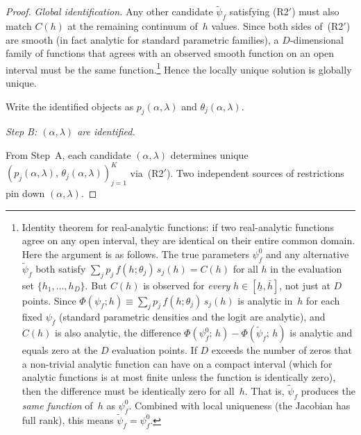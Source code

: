 \documentclass[12pt]{article}
\theoremstyle{plain}
\theoremstyle{plain}
\theoremstyle{definition}
\theoremstyle{remark}
\begin{document}
\begin{proof}
\emph{Global identification.}  Any other candidate $\tilde{\psi}_f$ satisfying (R2$'$) must also match $C(h)$ at the remaining continuum of~$h$ values.  Since both sides of~(R2$'$) are smooth (in fact analytic for standard parametric families), a $D$-dimensional family of functions that agrees with an observed smooth function on an open interval must be the same function.\footnote{Identity theorem for real-analytic functions: if two real-analytic functions agree on  any open interval, they are identical on their entire common domain.  Here the argument is as follows.  The true parameters $\psi_f^0$ and any alternative $\tilde{\psi}_f$ both satisfy $\sum_j p_j\,f(h;\theta_j)\,s_j(h) = C(h)$ for all $h$ in the evaluation set $\{h_1,\ldots,h_D\}$.  But $C(h)$ is observed for \emph{every} $h \in [\underline{h},\bar{h}]$, not just at $D$ points.  Since $\Phi(\psi_f; h) \equiv \sum_j p_j\,f(h;\theta_j)\,s_j(h)$ is analytic in~$h$ for each fixed $\psi_f$ (standard parametric densities and the logit are analytic), and $C(h)$ is also analytic, the difference $\Phi(\psi_f^0;\,h) - \Phi(\tilde{\psi}_f;\,h)$ is analytic and equals zero at the $D$ evaluation points.  If $D$ exceeds the number of zeros that a non-trivial analytic function can have on a compact interval (which for analytic functions is at most finite unless the function is identically zero), then the difference must be identically zero for all~$h$.  That is, $\tilde{\psi}_f$ produces the \emph{same function} of~$h$ as $\psi_f^0$.  Combined with local uniqueness (the Jacobian has full rank), this means $\tilde{\psi}_f = \psi_f^0$.}  Hence the locally unique solution is globally unique.

Write the identified objects as $p_j(\alpha,\lambda)$ and $\theta_j(\alpha,\lambda)$.

\medskip\noindent
\emph{Step B: $(\alpha,\lambda)$ are identified.}

From Step~A, each candidate $(\alpha,\lambda)$ determines unique $(p_j(\alpha,\lambda),\,\theta_j(\alpha,\lambda))_{j=1}^K$ via~(R2$'$).  Two independent sources of restrictions pin down $(\alpha,\lambda)$.


\end{proof}
\end{document}
